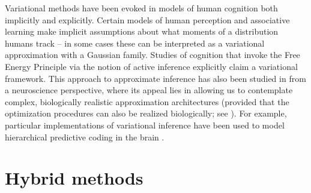 Variational methods have been evoked in models of human cognition both implicitly and explicitly. Certain models of human perception\cite{lau2018ensemble} and associative learning\cite{gershman2015unifying} make implicit assumptions about what moments of a distribution humans track -- in some cases these can be interpreted as a variational approximation with a Gaussian family. Studies of cognition that invoke the Free Energy Principle via the notion of active inference\cite{friston2015active}
explicitly claim a variational framework. This approach to approximate inference has also been studied in from a neuroscience perspective, where its appeal lies in allowing us to contemplate complex, biologically realistic approximation architectures (provided that the optimization procedures can also be realized biologically; see \citet{whittington2019theories}). For example, particular implementations of variational inference have been used to model hierarchical predictive coding in the brain \citep{friston2008hierarchical,gershman2019does}.


\section{Hybrid methods}
%

